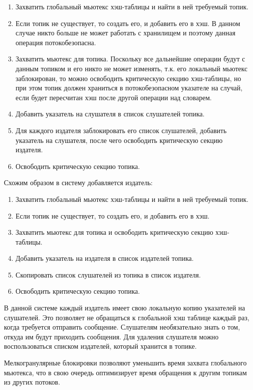 \begin{enumerate}
	\item Захватить глобальный мьютекс хэш-таблицы и найти в ней требуемый топик.
	\item Если топик не существует, то создать его, и добавить его в хэш. В данном случае никто больше не может работать с хранилищем и поэтому данная операция потокобезопасна.
	\item Захватить мьютекс для топика. Поскольку все дальнейшие операции будут с данным топиком и его никто не может изменять, т.к. его локальный мьютекс заблокирован, то можно освободить критическую секцию хэш-таблицы, но при этом топик должен храниться в потокобезопасном указателе на случай, если будет пересчитан хэш после другой операции над словарем.
	\item Добавить указатель на слушателя в список слушателей топика.
	\item Для каждого издателя заблокировать его список слушателей, добавить указатель на слушателя, после чего освободить критическую секцию издателя.
	\item Освободить критическую секцию топика.
\end{enumerate}

Схожим образом в систему добавляется издатель:

\begin{enumerate}
	\item Захватить глобальный мьютекс хэш-таблицы и найти в ней требуемый топик.
	\item Если топик не существует, то создать его, и добавить его в хэш.
	\item Захватить мьютекс для топика и освободить критическую секцию хэш-таблицы.
	\item Добавить указатель на издателя в список издателей топика.
	\item Скопировать список слушателей из топика в список издателя.
	\item Освободить критическую секцию топика.
\end{enumerate}

В данной системе каждый издатель имеет свою локальную копию указателей на слушателей. Это позволяет не обращаться к глобальной хэш таблице каждый раз, когда требуется отправить сообщение. Слушателям необязательно знать о том, откуда им будут приходить сообщения. Для удаления слушателя можно воспользоваться списком издателей, который хранится в топике.

Мелкогранулярные блокировки позволяют уменьшить время захвата глобального мьютекса, что в свою очередь оптимизирует время обращения к другим топикам из других потоков.


